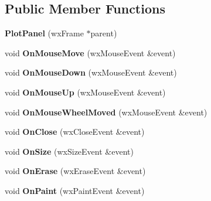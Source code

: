 \subsection*{Public Member Functions}
\begin{DoxyCompactItemize}
\item 
\hypertarget{class_plot_panel_a27892db4859ae9afca652f4175a7f88c}{{\bfseries Plot\-Panel} (wx\-Frame $\ast$parent)}\label{class_plot_panel_a27892db4859ae9afca652f4175a7f88c}

\item 
\hypertarget{class_plot_panel_aa44338288a6fce70a6683b3e556dc44d}{void {\bfseries On\-Mouse\-Move} (wx\-Mouse\-Event \&event)}\label{class_plot_panel_aa44338288a6fce70a6683b3e556dc44d}

\item 
\hypertarget{class_plot_panel_ad2e6780f516e870139eecf753223f708}{void {\bfseries On\-Mouse\-Down} (wx\-Mouse\-Event \&event)}\label{class_plot_panel_ad2e6780f516e870139eecf753223f708}

\item 
\hypertarget{class_plot_panel_a291b7a817083d10883226cf52a74e71e}{void {\bfseries On\-Mouse\-Up} (wx\-Mouse\-Event \&event)}\label{class_plot_panel_a291b7a817083d10883226cf52a74e71e}

\item 
\hypertarget{class_plot_panel_a6a537f5cdc334aaa423fa25d86bbf0af}{void {\bfseries On\-Mouse\-Wheel\-Moved} (wx\-Mouse\-Event \&event)}\label{class_plot_panel_a6a537f5cdc334aaa423fa25d86bbf0af}

\item 
\hypertarget{class_plot_panel_adb48aa0b95cd2e744795881146ca3563}{void {\bfseries On\-Close} (wx\-Close\-Event \&event)}\label{class_plot_panel_adb48aa0b95cd2e744795881146ca3563}

\item 
\hypertarget{class_plot_panel_a994c5955446c7b606ec70db498f4edc0}{void {\bfseries On\-Size} (wx\-Size\-Event \&event)}\label{class_plot_panel_a994c5955446c7b606ec70db498f4edc0}

\item 
\hypertarget{class_plot_panel_a7af545a2edf85655c28e5af4a41c0161}{void {\bfseries On\-Erase} (wx\-Erase\-Event \&event)}\label{class_plot_panel_a7af545a2edf85655c28e5af4a41c0161}

\item 
\hypertarget{class_plot_panel_a72ee37d726eb276bf9aca7f3b50c7b85}{void {\bfseries On\-Paint} (wx\-Paint\-Event \&event)}\label{class_plot_panel_a72ee37d726eb276bf9aca7f3b50c7b85}


\end{DoxyCompactItemize}
